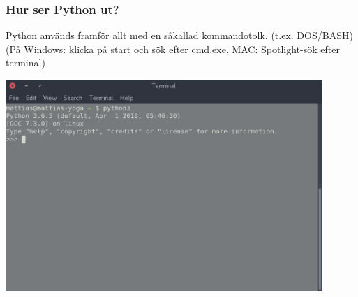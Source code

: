 \documentclass{beamer}
\begin{document}
\begin{frame}
	\frametitle{Hur ser Python ut?}
	Python används framför allt med en såkallad kommandotolk. (t.ex. DOS/BASH)
	(På Windows: klicka på start och sök efter cmd.exe, MAC: Spotlight-sök efter terminal)\\
	\begin{center}
	\includegraphics[width=0.9\textwidth]{other_pics/python_terminal_ex.png}
	\end{center}
\end{frame}
\end{document}

